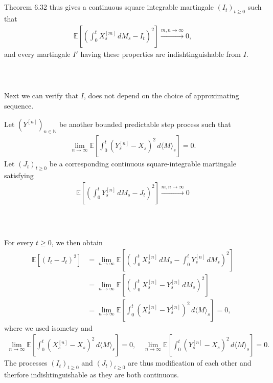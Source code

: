\documentclass{beamer}
\numberwithin{equation}{section}
\newenvironment{frame2}{\begin{frame}\frametitle{{\normalsize \secname} \\ {\large \subsecname}}}{\end{frame}}
\begin{document}
\begin{frame2}
    Theorem 6.32 thus gives a continuous square integrable martingale $(I_t)_{t\geq 0}$ such that
    \begin{align}
        \mathbb{E}\left[\left(\int_0^t X_s^{[m]}\, dM_s - I_t\right)^2\right] \xrightarrow{m,n\to\infty}0,
    \end{align}
    and every martingale $I'$ having these properties are indishtinguishable from $I$.
\end{frame2}

\begin{frame2}
    Next we can verify that $I$, does not depend on the choice of approximating sequence.

    \vspace{10pt}
    Let $(Y^{[n]})_{n \in \mathbb{N}}$ be another bounded predictable step process such that
    \begin{align}
        \lim_{n\to\infty}\mathbb{E}\left[\int_0^t \left(Y_s^{[n]} - X_s\right)^2 \, d\langle M \rangle_s\right] = 0.
    \end{align}
    Let $(J_t)_{t\geq 0}$ be a corresponding continuous square-integrable martingale satisfying
    \begin{align}
        \mathbb{E}\left[\left(\int_0^t Y_s^{[n]}\, dM_s - J_t\right)^2\right] \xrightarrow{m,n\to\infty}0
    \end{align}
\end{frame2}

\begin{frame2}
    For every $t\geq 0$, we then obtain
    \begin{align*}
        \mathbb{E}\left[(I_t - J_t)^2\right] &= \lim_{n\to\infty}\mathbb{E}\left[\left(\int_0^t X_s^{[n]}\, dM_s - \int_0^tY^{[n]}_s \, dM_s\right)^2\right] \\
        &=\lim_{n\to\infty}\mathbb{E}\left[\left(\int_0^t X_s^{[n]} - Y^{[n]}_s \, dM_s\right)^2\right] \\
        &=\lim_{n\to\infty}\mathbb{E}\left[\int_0^t\left( X_s^{[n]} - Y^{[n]}_s\right)^2 \, d\langle M \rangle_s\right] = 0,
    \end{align*}
    where we used isometry and
    \begingroup
    \footnotesize
    \begin{align*}
        \lim_{n \to \infty} \mathbb{E}\left[\int_0^t (X_s^{[n]} - X_s)^2 \, d\langle M \rangle_s\right] = 0, \quad
        \lim_{n\to\infty}\mathbb{E}\left[\int_0^t \left(Y_s^{[n]} - X_s\right)^2 \, d\langle M \rangle_s\right] = 0.
    \end{align*}
    \endgroup
    The processes $(I_t)_{t\geq 0}$ and $(J_t)_{t\geq 0}$ are thus modification of each other and therfore indishtinguishable as they are both continuous.
\end{frame2}
\end{document}
